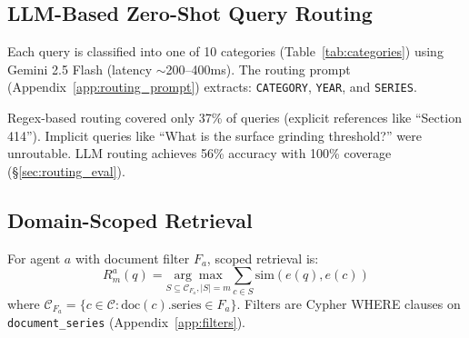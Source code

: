 \documentclass[11pt,a4paper]{article}
\begin{document}
\subsection{LLM-Based Zero-Shot Query Routing}
\label{sec:routing}

Each query is classified into one of 10 categories (Table~\ref{tab:categories}) using Gemini 2.5 Flash (latency $\sim$200--400ms). The routing prompt (Appendix~\ref{app:routing_prompt}) extracts: \texttt{CATEGORY}, \texttt{YEAR}, and \texttt{SERIES}.

\begin{table}[H]
\centering
{}
\caption{Category taxonomy aligned with WYDOT's organizational structure.}
\label{tab:categories}
\end{table}

Regex-based routing covered only 37\% of queries (explicit references like ``Section 414''). Implicit queries like ``What is the surface grinding threshold?'' were unroutable. LLM routing achieves 56\% accuracy with 100\% coverage (\S\ref{sec:routing_eval}).

\subsection{Domain-Scoped Retrieval}
\label{sec:scoped_search}

For agent $a$ with document filter $F_a$, scoped retrieval is:
\begin{equation}
R_m^a(q) = \underset{S \subseteq \mathcal{C}_{F_a}, |S|=m}{\arg\max} \sum_{c \in S} \text{sim}(e(q), e(c))
\end{equation}
where $\mathcal{C}_{F_a} = \{c \in \mathcal{C} : \text{doc}(c).\text{series} \in F_a\}$. Filters are Cypher WHERE clauses on \texttt{document\_series} (Appendix~\ref{app:filters}).
\end{document}
